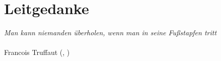 \section*{Leitgedanke} 

\vfill
{\Large \itshape 
Man kann niemanden überholen, wenn man in seine Fußstapfen tritt}\\ \ \\
Francois Truffaut (, ) %
\vfill
